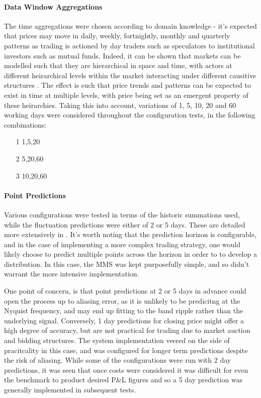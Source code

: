 \documentclass[a4paper,11pt,oneside]{article}
\theoremstyle{plain}
\theoremstyle{definition}
\begin{document}
\paragraph{Data Window Aggregations} The time aggregations were chosen according to domain knowledge - it's expected that prices may move in daily, weekly, fortnightly, monthly and quarterly patterns as trading is actioned by day traders such as speculators to institutional investors such as mutual funds. Indeed, it can be shown that markets can be modelled such that they are hierarchical in space and time, with actors at different heirarchical levels within the market interacting under different causitive structures \cite{Wilcox}. The effect is such that price trends and patterns can be expected to exist in time at multiple levels, with price being set as an emergent property of these heirarchies. Taking this into account, variations of 1, 5, 10, 20 and 60 working days were considered throughout the configuration tests, in the following combinations:  
\begin{itemize}
	\item[1] 1,5,20 
	\item[2] 5,20,60
	\item[3] 10,20,60
\end{itemize}

\paragraph {Point Predictions} Various configurations were tested in terms of the historic summations used, while the fluctuation predictions were either of 2 or 5 days. These are detailed more extensively in . It's worth noting that the prediction horizon is configurable, and in the case of implementing a more complex trading strategy, one would likely choose to predict multiple points across the horizon in order to to develop a distribution. In this case, the MMS was kept purposefully simple, and so didn't warrant the more intensive implementation. \newline

One point of concern, is that point predictions at 2 or 5 days in advance could open the process up to aliasing error, as it is unlikely to be predicitng at the Nyquist frequency, and may end up fitting to the band ripple rather than the underlying signal. Conversely, 1 day predictions for closing price might offer a high degree of accuracy, but are not practical for trading due to market auction and bidding structures. The system implementation veered on the side of pracitcality in this case, and was configured for longer term predictions despite the risk of aliasing. While some of the configurations were run with 2 day predictions, it was seen that once costs were considered it was difficult for even the benchmark to product desired P\&L figures and so a 5 day prediction was generally implemented in subsequent tests. 
\end{document}
